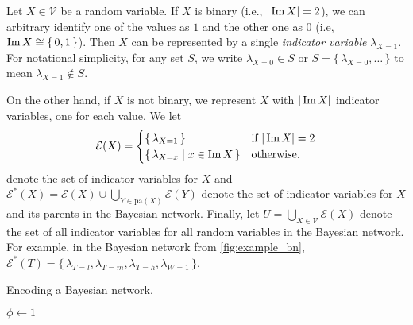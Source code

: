 \begin{definition}
  Let $X \in \mathcal{V}$ be a random variable. If $X$ is binary (i.e.,
  $|\operatorname{Im} X| = 2$), we can arbitrary identify one of the values as $1$ and the
  other one as $0$ (i.e, $\operatorname{Im} X \cong \{\, 0, 1 \,\}$). Then $X$ can be
  represented by a single \emph{indicator variable} $\lambda_{X=1}$. For
  notational simplicity, for any set $S$, we write $\lambda_{X=0} \in S$ or
  $S = \{\, \lambda_{X=0}, \dots \,\}$ to mean $\lambda_{X=1} \not\in S$.

  On the other hand, if $X$ is not binary, we represent $X$ with $|\operatorname{Im} X|$
  indicator variables, one for each value. We let
  \[
    \mathcal{E}(X) =
    \begin{cases}
      \{\, \lambda_{X=1} \,\} & \text{if } |\operatorname{Im} X| = 2 \\
      \{\, \lambda_{X=x} \mid x \in \operatorname{Im} X \,\} & \text{otherwise.}
    \end{cases}
  \]
  denote the set of indicator variables for $X$ and
  $\mathcal{E}^*(X) = \mathcal{E}(X) \cup \bigcup_{Y \in \mathrm{pa}(X)} \mathcal{E}(Y)$
  denote the set of indicator variables for $X$ and its parents in the Bayesian
  network. Finally, let $U = \bigcup_{X \in \mathcal{V}} \mathcal{E}(X)$ denote
  the set of all indicator variables for all random variables in the Bayesian
  network. For example, in the Bayesian network from \cref{fig:example_bn},
  $\mathcal{E}^*(T) = \{\, \lambda_{T=l}, \lambda_{T=m}, \lambda_{T=h}, \lambda_{W=1} \,\}$.
\end{definition}

\begin{algorithm}[t]
  \caption{Encoding a Bayesian network.}\label{alg:encoding}
  $\phi \gets 1$\;
\end{algorithm}

